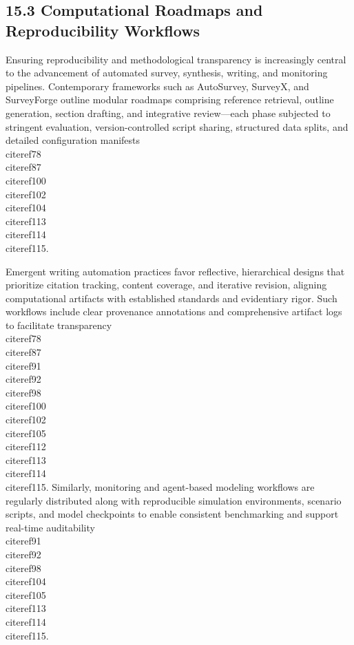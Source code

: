 \documentclass[11pt]{article}
\begin{document}
\subsection{15.3 Computational Roadmaps and Reproducibility Workflows}

Ensuring reproducibility and methodological transparency is increasingly central to the advancement of automated survey, synthesis, writing, and monitoring pipelines. Contemporary frameworks such as AutoSurvey, SurveyX, and SurveyForge outline modular roadmaps comprising reference retrieval, outline generation, section drafting, and integrative review—each phase subjected to stringent evaluation, version-controlled script sharing, structured data splits, and detailed configuration manifests~\\cite{ref78}\\cite{ref87}\\cite{ref100}\\cite{ref102}\\cite{ref104}\\cite{ref113}\\cite{ref114}\\cite{ref115}.

Emergent writing automation practices favor reflective, hierarchical designs that prioritize citation tracking, content coverage, and iterative revision, aligning computational artifacts with established standards and evidentiary rigor. Such workflows include clear provenance annotations and comprehensive artifact logs to facilitate transparency~\\cite{ref78}\\cite{ref87}\\cite{ref91}\\cite{ref92}\\cite{ref98}\\cite{ref100}\\cite{ref102}\\cite{ref105}\\cite{ref112}\\cite{ref113}\\cite{ref114}\\cite{ref115}. Similarly, monitoring and agent-based modeling workflows are regularly distributed along with reproducible simulation environments, scenario scripts, and model checkpoints to enable consistent benchmarking and support real-time auditability~\\cite{ref91}\\cite{ref92}\\cite{ref98}\\cite{ref104}\\cite{ref105}\\cite{ref113}\\cite{ref114}\\cite{ref115}.
\end{document}
